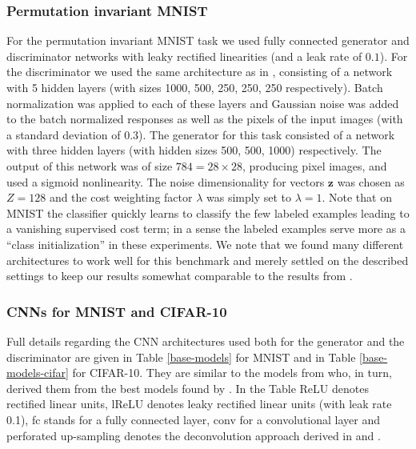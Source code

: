 \documentclass{article} \usepackage{iclr2016_conference,times}
\newcommand{\bz}{\mathbf{z}}
\newcommand{\TODO}[2][JTS]{}
\begin{document}
\begin{appendix}
\subsubsection{Permutation invariant MNIST}
For the permutation invariant MNIST task we used fully connected
generator and discriminator networks with leaky rectified linearities
(and a leak rate of $0.1$). For the discriminator we used the same
architecture as in \citet{Rasmus_NIPS2015}, consisting of a network
with 5 hidden layers (with sizes 1000, 500, 250, 250, 250
respectively). Batch normalization was applied to each of these layers
and Gaussian noise was added to the batch normalized responses as well
as the pixels of the input images (with a standard deviation of 0.3).
The generator for this task consisted of a network with three hidden
layers (with hidden sizes 500, 500, 1000) respectively. The output of
this network was of size $784 = 28 \times 28$, producing pixel images,
and used a sigmoid nonlinearity. The noise dimensionality for vectors
$\bz$ was chosen as $Z = 128$ and the cost weighting factor $\lambda$
was simply set to $\lambda = 1$. Note that on MNIST the classifier
quickly learns to classify the few labeled examples leading to a
vanishing supervised cost term; in a sense the labeled examples serve
more as a ``class initialization'' in these experiments. We note that we
found many different architectures to work well for this benchmark and
merely settled on the described settings to keep our results somewhat
comparable to the results from \citet{Rasmus_NIPS2015}.

\subsubsection{CNNs for MNIST and CIFAR-10}
Full details regarding the CNN architectures used both for the
generator and the discriminator are given in Table \ref{base-models}
for MNIST and in Table \ref{base-models-cifar} for CIFAR-10. They are
similar to the models from \citet{Rasmus_NIPS2015} who, in turn,
derived them from the best models found by \citet{SprDosBroRied15}. In
the Table ReLU denotes rectified linear units, lReLU denotes leaky
rectified linear units (with leak rate 0.1), fc stands for a fully
connected layer, conv for a convolutional layer and perforated
up-sampling denotes the deconvolution approach derived in
\citet{DosSprChair15} and \citet{OseSoySma2014}. 
\TODO{Double check that these network definitions are correct}




\end{appendix}
\end{document}

